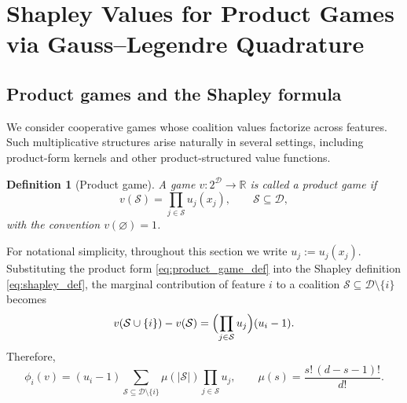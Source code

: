 \documentclass{article}
\newtheorem{definition}{Definition}
\newcommand{\cD}{\mathcal{D}}
\newcommand{\cS}{\mathcal{S}}
\begin{document}


\section{Shapley Values for Product Games via Gauss--Legendre Quadrature}
\label{sec:product_games_glq}

\subsection{Product games and the Shapley formula}
\label{subsec:product_games_shapley}

We consider cooperative games whose coalition values factorize across features. 
Such multiplicative structures arise naturally in several settings, including product-form kernels and other product-structured value functions.

\begin{definition}[Product game]
\label{def:product_game}
A game $v:2^{\cD}\to\mathbb{R}$ is called a \emph{product game} if
\begin{equation}
\label{eq:product_game_def}
v(\cS)=\prod_{j\in \cS} u_j(x_j),
\qquad \cS\subseteq \cD,
\end{equation}
with the convention $v(\varnothing)=1$.
\end{definition}

For notational simplicity, throughout this section we write $u_j := u_j(x_j)$.
Substituting the product form \cref{eq:product_game_def} into the Shapley definition \cref{eq:shapley_def}, the marginal contribution of feature $i$ to a coalition $\cS\subseteq \cD\setminus\{i\}$ becomes
\begin{equation}
\label{eq:marginal_contrib_product_game}
v(\cS\cup\{i\})-v(\cS)
=
\Bigl(\prod_{j\in \cS} u_j\Bigr)(u_i-1).
\end{equation}
Therefore,
\begin{equation}
\label{eq:shapley_weighted_esp_form}
\phi_i(v)
=
(u_i-1)
\sum_{\cS\subseteq \cD\setminus\{i\}}
\mu(|\cS|)\prod_{j\in \cS}u_j,
\qquad
\mu(s)=\frac{s!\,(d-s-1)!}{d!}.
\end{equation}
\end{document}

